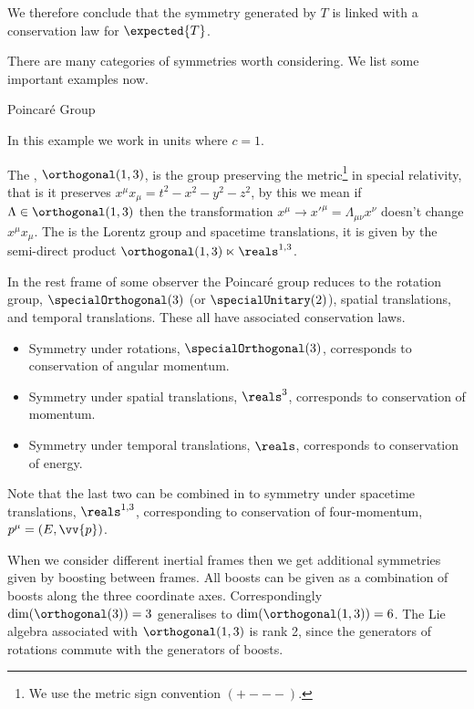 \documentclass[fleqn]{NotesClass}
\begin{document}
    We therefore conclude that the symmetry generated by \(T\) is linked with a conservation law for \(\expected{T}\).
    
    There are many categories of symmetries worth considering.
    We list some important examples now.
    
    \begin{exm}{Poincar\'e Group}{}
        \begin{rmk}
            In this example we work in units where \(c = 1\).
        \end{rmk}
        The , \(\orthogonal(1, 3)\), is the group preserving the metric\footnote{We use the metric sign convention \(({+}{-}{-}{-})\).} in special relativity, that is it preserves \(x^\mu x_\mu = t^2 - x^2 - y^2 - z^2\), by this we mean if \(\Lambda \in \orthogonal(1, 3)\) then the transformation \(x^\mu \to x'^\mu = \Lambda_{\mu\nu}x^\nu\) doesn't change \(x^\mu x_\mu\).
        The  is the Lorentz group and spacetime translations, it is given by the semi-direct product \(\orthogonal(1, 3) \ltimes \reals^{1,3}\).
        
        In the rest frame of some observer the Poincar\'e group reduces to the rotation group, \(\specialOrthogonal(3)\) (or \(\specialUnitary(2)\)), spatial translations, and temporal translations.
        These all have associated conservation laws.
        \begin{itemize}
            \item Symmetry under rotations, \(\specialOrthogonal(3)\), corresponds to conservation of angular momentum.
            \item Symmetry under spatial translations, \(\reals^3\), corresponds to conservation of momentum.
            \item Symmetry under temporal translations, \(\reals\), corresponds to conservation of energy.
        \end{itemize}
        Note that the last two can be combined in to symmetry under spacetime translations, \(\reals^{1,3}\), corresponding to conservation of four-momentum, \(p^\mu = (E, \vv{p})\).
        
        When we consider different inertial frames then we get additional symmetries given by boosting between frames.
        All boosts can be given as a combination of boosts along the three coordinate axes.
        Correspondingly \(\dim(\orthogonal(3)) = 3\) generalises to \(\dim(\orthogonal(1, 3)) = 6\).
        The Lie algebra associated with \(\orthogonal(1, 3)\) is rank 2, since the generators of rotations commute with the generators of boosts.
    \end{exm}
    
\end{document}
